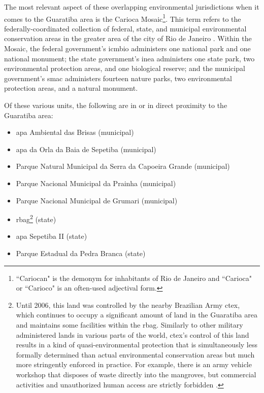 The most relevant aspect of these overlapping environmental jurisdictions when it comes to the Guaratiba area is the Carioca Mosaic\footnote{``Cariocan" is the demonym for inhabitants of Rio de Janeiro and ``Carioca" or ``Carioco" is an often-used adjectival form.}. This term refers to the federally-coordinated collection of federal, state, and municipal environmental conservation areas in the greater area of the city of Rio de Janeiro \cite{teixeiraPORTARIANo2452011}. Within the Mosaic, the federal government's \ac{icmbio} administers one national park and one national monument; the state government's \ac{inea} administers one state park, two environmental protection areas, and one biological reserve; and the municipal government's \ac{smac} administers fourteen nature parks, two environmental protection areas, and a natural monument.

Of these various units, the following are in or in direct proximity to the Guaratiba area:

{
\begin{itemize}
	\item \ac{apa} Ambiental das Brisas (municipal)
	\item \ac{apa} da Orla da Baia de Sepetiba (municipal) 
	\item Parque Natural Municipal da Serra da Capoeira Grande (municipal)
	\item Parque Nacional Municipal da Prainha (municipal)
	\item Parque Nacional Municipal de Grumari (municipal)
	\item \ac{rbag}\footnote{Until 2006, this land was controlled by the nearby Brazilian Army \ac{ctex}, which continues to occupy a significant amount of land in the Guaratiba area and maintains some facilities within the \ac{rbag}. Similarly to other military administered lands in various parts of the world, \ac{ctex}'s control of this land results in a kind of quasi-environmental protection that is simultaneously less formally determined than actual environmental conservation areas but much more stringently enforced in practice. For example, there is an army vehicle workshop that disposes of waste directly into the mangroves, but commercial activities and unauthorized human access are strictly forbidden \cite{herzogGuaratibaVerdeSubsidios2009}.} (state)
	\item \ac{apa} Sepetiba II (state)
	\item Parque Estadual da Pedra Branca (state)
\end{itemize}}

